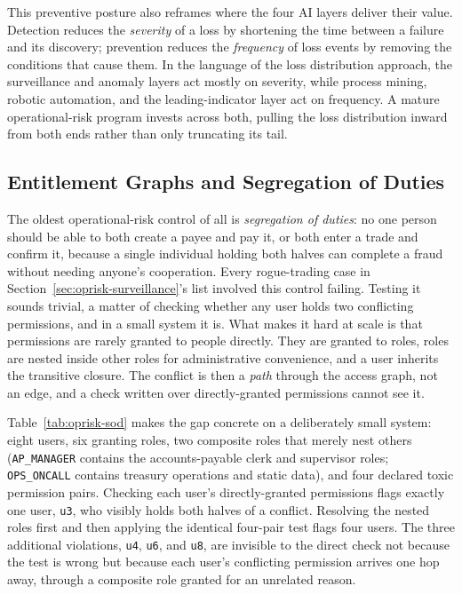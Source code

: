 \documentclass[../ai_in_finance]{subfiles}
\begin{document}
This preventive posture also reframes where the four AI layers deliver their value. Detection reduces the \emph{severity} of a loss by shortening the time between a failure and its discovery; prevention reduces the \emph{frequency} of loss events by removing the conditions that cause them. In the language of the loss distribution approach, the surveillance and anomaly layers act mostly on severity, while process mining, robotic automation, and the leading-indicator layer act on frequency. A mature operational-risk program invests across both, pulling the loss distribution inward from both ends rather than only truncating its tail.

\subsection{Entitlement Graphs and Segregation of Duties}
\label{sec:oprisk-entitlements}

The oldest operational-risk control of all is \emph{segregation of duties}: no one person should be able to both create a payee and pay it, or both enter a trade and confirm it, because a single individual holding both halves can complete a fraud without needing anyone's cooperation. Every rogue-trading case in Section~\ref{sec:oprisk-surveillance}'s list involved this control failing. Testing it sounds trivial, a matter of checking whether any user holds two conflicting permissions, and in a small system it is. What makes it hard at scale is that permissions are rarely granted to people directly. They are granted to roles, roles are nested inside other roles for administrative convenience, and a user inherits the transitive closure. The conflict is then a \emph{path} through the access graph, not an edge, and a check written over directly-granted permissions cannot see it.

Table~\ref{tab:oprisk-sod} makes the gap concrete on a deliberately small system: eight users, six granting roles, two composite roles that merely nest others (\texttt{AP\_MANAGER} contains the accounts-payable clerk and supervisor roles; \texttt{OPS\_ONCALL} contains treasury operations and static data), and four declared toxic permission pairs. Checking each user's directly-granted permissions flags exactly one user, \texttt{u3}, who visibly holds both halves of a conflict. Resolving the nested roles first and then applying the identical four-pair test flags four users. The three additional violations, \texttt{u4}, \texttt{u6}, and \texttt{u8}, are invisible to the direct check not because the test is wrong but because each user's conflicting permission arrives one hop away, through a composite role granted for an unrelated reason.
\end{document}
